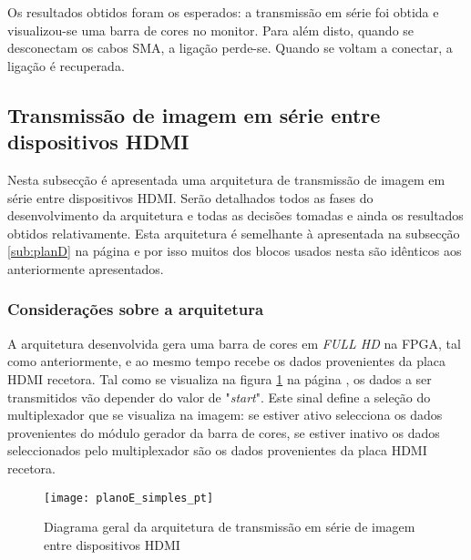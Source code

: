 Os resultados obtidos foram os esperados: a transmissão em série foi obtida e visualizou-se uma barra de cores no monitor. Para além disto, quando se desconectam os cabos SMA, a ligação perde-se. Quando se voltam a conectar, a ligação é recuperada.





\subsection{Transmissão de imagem em série entre dispositivos HDMI} \label{sub:planE}

Nesta subsecção é apresentada uma arquitetura de transmissão de imagem em série entre dispositivos HDMI. Serão detalhados todos as fases do desenvolvimento da arquitetura e todas as decisões tomadas e ainda os resultados obtidos relativamente. Esta arquitetura é semelhante à apresentada na subsecção \ref{sub:planD} na página \pageref{sub:planD} e por isso muitos dos blocos usados nesta são idênticos aos anteriormente apresentados.

\subsubsection{Considerações sobre a arquitetura} \label{subsub:planE_considerações}

A arquitetura desenvolvida gera uma barra de cores em \textit{FULL HD} na FPGA, tal como anteriormente, e ao mesmo tempo recebe os dados provenientes da placa HDMI recetora. Tal como se visualiza na figura \ref{fig:planE_simples} na página \pageref{fig:planE_simples}, os dados a ser transmitidos vão depender do valor de "\textit{start}". Este sinal define a seleção do multiplexador que se visualiza na imagem: se estiver ativo selecciona os dados provenientes do módulo gerador da barra de cores, se estiver inativo os dados seleccionados pelo multiplexador são os dados provenientes da placa HDMI recetora.

\begin{figure}[h!]
	\begin{center}
		\leavevmode
		\texttt{[image: planoE\_simples\_pt]}
		\captionsetup{width=1.0\linewidth}
		\caption[Diagrama geral da arquitetura de transmissão em série de imagem entre dispositivos HDMI]{Diagrama geral da arquitetura de transmissão em série de imagem entre dispositivos HDMI}
		\label{fig:planE_simples}
	\end{center}
\end{figure}


